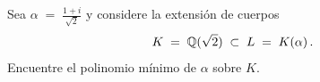 Sea $\displaystyle \alpha \;=\;\frac{1+i}{\sqrt{2}}$ y considere la extensión de cuerpos
\[
K \;=\; \mathbb{Q}(\sqrt{2})
\;\subset\;
L \;=\; K(\alpha)\,.
\]
Encuentre el polinomio mínimo de $\alpha$ sobre $K$.
